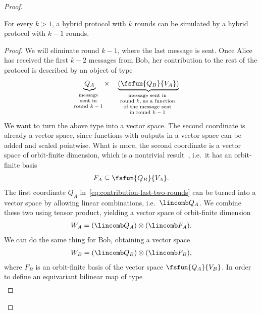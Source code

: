 \begin{proof}
    \begin{claim}\label{claim:reduce-round}
        For every $k > 1$, a hybrid protocol with $k$ rounds can be simulated by a hybrid protocol with $k-1$ rounds.
    \end{claim}
    \begin{proof}
        We will eliminate round $k-1$, where the last message is sent. Once Alice has received the first $k-2$ messages from Bob, her contribution to the rest of the protocol is described by an object of type 
          \begin{align}\label{eq:contribution-last-two-rounds}
            \myunderbrace{Q_A}{message \\ sent in \\ round $k-1$} \quad \times \quad  \myunderbrace{(\fsfun  {Q_B} {V_A})}{message sent in \\ round $k$, as a function \\ of the message sent \\ in  round $k-1$}
        \end{align}
        We want to turn the above type into a vector space. The second coordinate is already a vector space, since functions with outputs in a vector space can be added and scaled pointwise. What is more, the  second coordinate  is  a vector space of orbit-finite dimension, which is a nontrivial result~\cite[Theorem 8.16]{bojanczyk_slightly}, i.e.~it has an orbit-finite basis  
        \begin{align*}
        F_A \subseteq \fsfun  {Q_B} {V_A}.  
        \end{align*}
        The first coordinate $Q_A$ in~\eqref{eq:contribution-last-two-rounds} can be turned into a vector space by  allowing linear combinations, i.e.~$\lincomb Q_A$. We combine these two using tensor product, yielding a vector space of orbit-finite dimension
        \begin{align*}
           W_A =  (\lincomb Q_A) \otimes (\lincomb F_A).
        \end{align*}
        We can do the same thing for Bob, obtaining a vector space
        \begin{align*}
           W_B =  (\lincomb Q_B) \otimes (\lincomb F_B),
        \end{align*}
        where $F_B$ is an orbit-finite basis of the vector space $\fsfun  {Q_A} {V_B}$.
        In order to define an equivariant bilinear map of type
        \begin{align*}

\end{align*}
\end{proof}
\end{proof}
